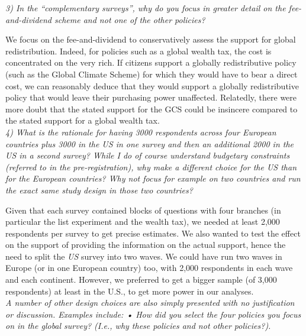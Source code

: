 \documentclass[12pt,english]{article}
\begin{document}

\textit{3) In the “complementary surveys”, why do you focus in greater detail on the fee-and-dividend scheme and not one of the other policies?}

We focus on the fee-and-dividend to conservatively assess the support for global redistribution. Indeed, for policies such as a global wealth tax, the cost is concentrated on the very rich. If citizens support a globally redistributive policy (such as the Global Climate Scheme) for which they would have to bear a direct cost, we can reasonably deduce that they would support a globally redistributive policy that would leave their purchasing power unaffected. Relatedly, there were more doubt that the stated support for the GCS could be insincere compared to the stated support for a global wealth tax.
~\\

\textit{4) What is the rationale for having 3000 respondents across four European countries plus 3000 in the US in one survey and then an additional 2000 in the US in a second survey? While I do of course understand budgetary constraints (referred to in the pre-registration), why make a different choice for the US than for the European countries? Why not focus for example on two countries and run the exact same study design in those two countries?}

Given that each survey contained blocks of questions with four branches (in particular the list experiment and the wealth tax), we needed at least 2,000 respondents per survey to get precise estimates. We also wanted to test the effect on the support of providing the information on the actual support, hence the need to split the \textit{US} survey into two waves. We could have run two waves in Europe (or in one European country) too, with 2,000 respondents in each wave and each continent. However, we preferred to get a bigger sample (of 3,000 respondents) at least in the U.S., to get more power in our analyses.
~\\

\textit{A number of other design choices are also simply presented with no justification or discussion. Examples include:
• How did you select the four policies you focus on in the global survey? (I.e., why these policies and not other policies?).}
\end{document}
